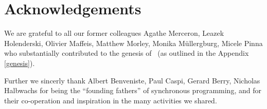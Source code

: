 \newpage
\section*{Acknowledgements}

We are grateful to all our former colleagues Agathe Merceron, Leazek 
Holenderski, Olivier Maffeis, Matthew Morley, Monika M\"ullergburg, 
Micele Pinna who substantially contributed to the genesis of \se\ 
(as outlined in the Appendix \ref{genesis}).

Further we sincerly thank Albert Benveniste, Paul Caspi, Gerard Berry, Nicholas Halbwachs for being the ``founding fathers'' of synchronous programming, and
for their co-operation and inspiration in the many activities we shared.